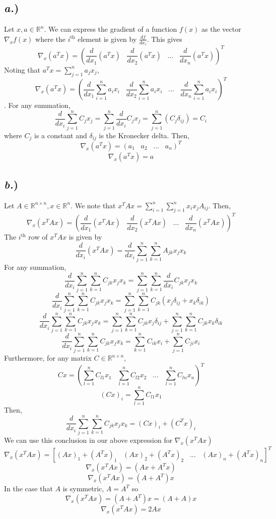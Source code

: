 \documentclass{report}
\begin{document}
\subsection*{\textit{a.})}
Let $x, a \in \mathbb{R}^n.$ We can express the gradient of a function $f(x)$ as the vector $\nabla_xf(x)$ where the $i^{\text{th}}$ element is given by $\frac{df}{dx_i}$. This gives
$$ \nabla_x(a^Tx) = \left(\frac{d}{dx_1}(a^Tx) \;\;\; \frac{d}{dx_2}(a^Tx) \;\;\; ... \;\;\; \frac{d}{dx_n}(a^Tx)\right)^T$$
Noting that $a^Tx = \sum_{j=1}^{n}{a_j x_j}$,
$$ \nabla_x(a^Tx) = \left(\frac{d}{dx_1}\sum_{i=1}^{n}{a_i x_i} \;\;\; \frac{d}{dx_2}\sum_{i=1}^{n}{a_i x_i} \;\;\; ... \;\;\; \frac{d}{dx_n}\sum_{i=1}^{n}{a_i x_i}\right)^T$$.
For any summation, 
$$ \frac{d}{dx_i}\sum_{j=1}^{n}{C_j x_j} = \sum_{j=1}^{n}{\frac{d}{dx_i}{C_j x_j}} = \sum_{j=1}^{n}(C_j \delta_{ij}) = C_i$$
where $C_j$ is a constant and $\delta_{ij}$ is the Kronecker delta. Then,
$$ \nabla_x(a^Tx) = \left(a_1 \;\;\; a_2 \;\;\; ... \;\;\; a_n\right)^T$$
$$\boxed{ \nabla_x(a^Tx) = a }$$

\subsection*{\textit{b.})}

Let $A \in \mathbb{R}^{n \times n}, x \in \mathbb{R}^{n}.$ We note that $x^TAx = \sum_{i=1}^n\sum_{j=1}^n{x_i x_j A_{ij}}$. Then,
$$ \nabla_x(x^TAx) = \left(\frac{d}{dx_1}(x^TAx) \;\;\; \frac{d}{dx_2}(x^TAx) \;\;\; ... \;\;\; \frac{d}{dx_n}(x^TAx)\right)^T$$
The $i^{\text{th}}$ row of $x^TAx$ is given by
$$ \frac{d}{dx_i}(x^TAx) = \frac{d}{dx_i}\sum_{j=1}^n\sum_{k=1}^n{A_{jk} x_j x_k} $$
For any summation,
$$ \frac{d}{dx_i}\sum_{j=1}^n\sum_{k=1}^n{C_{jk}x_j x_k} = \sum_{j=1}^n\sum_{k=1}^n{\frac{d}{dx_i}C_{jk}x_j x_k} $$
$$ \frac{d}{dx_i}\sum_{j=1}^n\sum_{k=1}^n{C_{jk}x_j x_k} = \sum_{j=1}^n\sum_{k=1}^n{C_{jk}(x_j\delta_{ij} + x_k\delta_{ik})} $$
$$ \frac{d}{dx_i}\sum_{j=1}^n\sum_{k=1}^n{C_{jk}x_j x_k} = \sum_{j=1}^n\sum_{k=1}^n{C_{jk}x_j\delta_{ij}} + \sum_{j=1}^n\sum_{k=1}^n{C_{jk}x_k\delta_{ik}} $$
$$ \frac{d}{dx_i}\sum_{j=1}^n\sum_{k=1}^n{C_{jk}x_j x_k} = \sum_{k=1}^n{C_{ik}x_i} + \sum_{j=1}^n{C_{ji}x_i} $$
Furthermore, for any matrix $C \in \mathbb{R}^{n \times n},$
$$ Cx = \left( \sum_{l=1}^{n}C_{l1} x_1 \;\;\; \sum_{l=1}^{n}C_{l2} x_2 \;\;\; ... \;\;\; \sum_{l=1}^{n}C_{ln} x_n \right)^T$$
$$ (Cx)_i = \sum_{l=1}^{n}C_{l1} x_1 $$
Then,
$$ \frac{d}{dx_i}\sum_{j=1}^n\sum_{k=1}^n{C_{jk}x_j x_k} = (Cx)_i + (C^Tx)_i $$
We can use this conclusion in our above expression for $\nabla_x(x^TAx)$
$$ \nabla_x(x^TAx) = \left[(Ax)_1 + (A^Tx)_1 \;\;\; (Ax)_2 + (A^Tx)_2  \;\;\; ... \;\;\; (Ax)_n + (A^Tx)_n\right]^T$$
$$ \nabla_x(x^TAx) =(Ax + A^Tx) $$
$$ \nabla_x(x^TAx) = (A + A^T)x $$
In the case that $A$ is symmetric, $A = A^T$ so
$$ \nabla_x(x^TAx) = (A + A^T)x = (A + A)x $$
$$\boxed{ \nabla_x(x^TAx) = 2Ax }$$
\end{document}
